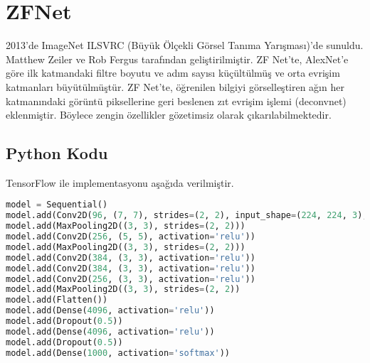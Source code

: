 \section{ZFNet}
2013'de ImageNet ILSVRC (Büyük Ölçekli Görsel Tanıma Yarışması)'de sunuldu. Matthew Zeiler ve Rob Fergus tarafından geliştirilmiştir. ZF Net'te, AlexNet'e göre ilk katmandaki filtre boyutu ve adım sayısı küçültülmüş ve orta evrişim katmanları büyütülmüştür. ZF Net'te, öğrenilen bilgiyi görselleştiren ağın her katmanındaki görüntü piksellerine geri beslenen zıt evrişim işlemi (deconvnet) eklenmiştir. Böylece zengin özellikler gözetimsiz olarak çıkarılabilmektedir.

\subsection{Python Kodu}

TensorFlow ile implementasyonu aşağıda verilmiştir.

\begin{lstlisting}[language=Python]
model = Sequential()
model.add(Conv2D(96, (7, 7), strides=(2, 2), input_shape=(224, 224, 3), activation='relu'))
model.add(MaxPooling2D((3, 3), strides=(2, 2)))
model.add(Conv2D(256, (5, 5), activation='relu'))
model.add(MaxPooling2D((3, 3), strides=(2, 2)))
model.add(Conv2D(384, (3, 3), activation='relu'))
model.add(Conv2D(384, (3, 3), activation='relu'))
model.add(Conv2D(256, (3, 3), activation='relu'))
model.add(MaxPooling2D((3, 3), strides=(2, 2))
model.add(Flatten())
model.add(Dense(4096, activation='relu'))
model.add(Dropout(0.5))
model.add(Dense(4096, activation='relu'))
model.add(Dropout(0.5))
model.add(Dense(1000, activation='softmax'))
\end{lstlisting}

\newpage